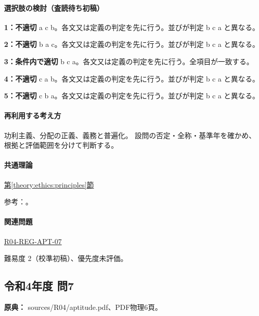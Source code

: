 \paragraph{選択肢の検討（査読待ち初稿）}\mbox{}\par

\noindent\textbf{1：不適切} a c b。各文又は定義の判定を先に行う。並びが判定 b c a と異なる。\par

\noindent\textbf{2：不適切} b a c。各文又は定義の判定を先に行う。並びが判定 b c a と異なる。\par

\noindent\textbf{3：条件内で適切} b c a。各文又は定義の判定を先に行う。全項目が一致する。\par

\noindent\textbf{4：不適切} c a b。各文又は定義の判定を先に行う。並びが判定 b c a と異なる。\par

\noindent\textbf{5：不適切} c b a。各文又は定義の判定を先に行う。並びが判定 b c a と異なる。\par

\paragraph{再利用する考え方} 功利主義、分配の正義、義務と普遍化。 設問の否定・全称・基準年を確かめ、根拠と評価範囲を分けて判断する。

\paragraph{共通理論} \hyperref[theory:ethics:principles]{第\ref*{theory:ethics:principles}節}

\par 参考：\cite{scu_ethics_framework}。

\paragraph{関連問題} \hyperref[q:r04-reg-apt-07]{R04-REG-APT-07}

\par 難易度 2（校準初稿）、優先度未評価。

\subsection{令和4年度 問7}
\label{q:r04-reg-apt-07}

\noindent\textbf{原典：} sources/R04/aptitude.pdf、PDF物理6頁。

